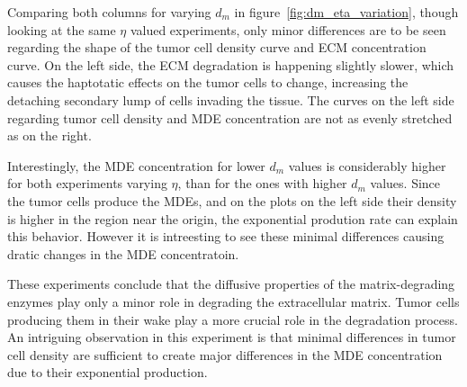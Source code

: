 Comparing both columns for varying $d_m$ in figure~\ref{fig:dm_eta_variation}, though looking at the same $\eta$ valued experiments, only minor differences are to be seen regarding the shape of the tumor cell density curve and ECM concentration curve. On the left side, the ECM degradation is happening slightly slower, which causes the haptotatic effects on the tumor cells to change, increasing the detaching secondary lump of cells invading the tissue. The curves on the left side regarding tumor cell density and MDE concentration are not as evenly stretched as on the right.

Interestingly, the MDE concentration for lower $d_m$ values is considerably higher for both experiments varying $\eta$, than for the ones with higher $d_m$ values. Since the tumor cells produce the MDEs, and on the plots on the left side their density is higher in the region near the origin, the exponential prodution rate can explain this behavior. However it is intreesting to see these minimal differences causing dratic changes in the MDE concentratoin. 

These experiments conclude that the diffusive properties of the matrix-degrading enzymes play only a minor role in degrading the extracellular matrix. Tumor cells producing them in their wake play a more crucial role in the degradation process. An intriguing observation in this experiment is that minimal differences in tumor cell density are sufficient to create major differences in the MDE concentration due to their exponential production.


